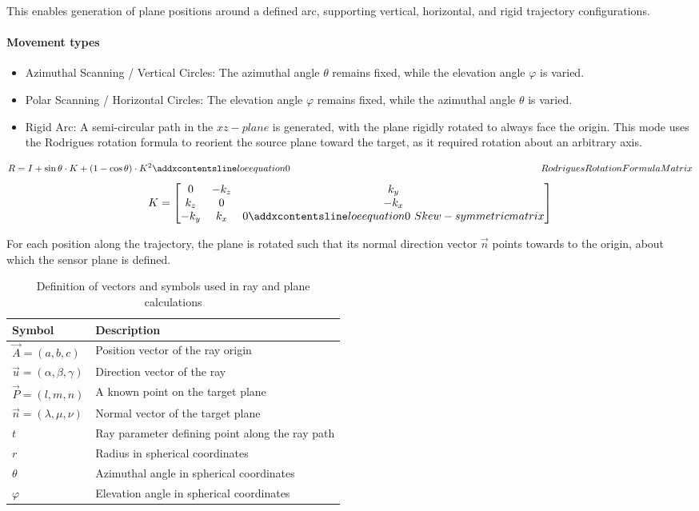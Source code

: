 This enables generation of plane positions around a defined arc, supporting vertical, horizontal, and rigid trajectory configurations.

\paragraph{Movement types}
\begin{itemize}
    \item Azimuthal Scanning / Vertical Circles: The azimuthal angle $\theta$ remains fixed, while the elevation angle $\varphi$ is varied. 
    \item Polar Scanning / Horizontal Circles: The elevation angle $\varphi$ remains fixed, while the azimuthal angle $\theta$ is varied. 
    \item Rigid Arc: A semi-circular path in the $xz-plane$ is generated, with the plane rigidly rotated to always face the origin. This mode uses the Rodrigues rotation formula to reorient the source plane toward the target, as it required rotation about an arbitrary axis.  
\end{itemize}

\begin{equation}
R = I + \sin\theta \cdot K + (1 - \cos\theta) \cdot K^2
\label{eq:RodriguesMatrix}
\addequation{Rodrigues Rotation Formula Matrix}
\end{equation}
\begin{equation}
K = 
\begin{bmatrix}
0 & -k_z & k_y \\
k_z & 0 & -k_x \\
-k_y & k_x & 0
\addequation{Skew-symmetric matrix}
\end{bmatrix}
\end{equation}

For each position along the trajectory, the plane is rotated such that its normal direction vector $\vec{n}$ points towards to the origin, about which the sensor plane is defined.  

\begin{table}[H]
\centering
\caption{Definition of vectors and symbols used in ray and plane calculations}
\label{tab:symbols}
\begin{tabular}{ll}
\toprule
\textbf{Symbol} & \textbf{Description} \\
\midrule
$\vec{A} = (a, b, c)$ & Position vector of the ray origin \\
$\vec{u} = (\alpha, \beta, \gamma)$ & Direction vector of the ray \\
$\vec{P} = (l, m, n)$ & A known point on the target plane \\
$\vec{n} = (\lambda, \mu, \nu)$ & Normal vector of the target plane \\
$t$ & Ray parameter defining point along the ray path \\
$r$ & Radius in spherical coordinates \\
$\theta$ & Azimuthal angle in spherical coordinates \\
$\varphi$ & Elevation angle in spherical coordinates \\
\bottomrule
\end{tabular}
\end{table}